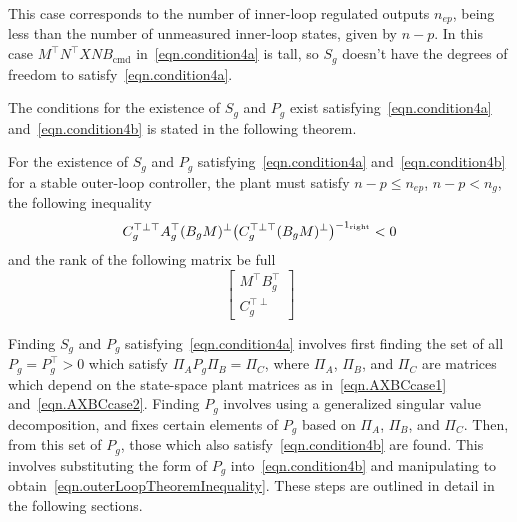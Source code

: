 \documentclass[journal]{IEEEtran}
\theoremstyle{innercustomthm}
\begin{document}
  This case corresponds to the number of inner-loop regulated outputs $n_{ep}$, being less than the number of unmeasured inner-loop states, given by $n-p$.
  In this case $M^{\top}N^{\top}XNB_{\text{cmd}}$ in\ \eqref{eqn.condition4a} is tall, so $S_{g}$ doesn't have the degrees of freedom to satisfy\ \eqref{eqn.condition4a}.

  The conditions for the existence of $S_{g}$ and $P_{g}$ exist satisfying\ \eqref{eqn.condition4a} and\ \eqref{eqn.condition4b} is stated in the following theorem.

  \begin{thm-dan}\label{thm.existenceOuterLoop}
    For the existence of $S_{g}$ and $P_{g}$ satisfying\ \eqref{eqn.condition4a} and\ \eqref{eqn.condition4b} for a stable outer-loop controller, the plant must satisfy $n-p\leq n_{ep}$, $n-p<n_{g}$, the following inequality
    \begin{equation}
      \label{eqn.outerLoopTheoremInequality}
      C_{g}^{\top\perp\top}A_{g}^{\top}(B_{g}M)^{\perp}\bigr(C_{g}^{\top\perp\top}(B_{g}M)^{\perp}\bigr)^{-1_{\textnormal{right}}}
      <
      0
    \end{equation}
    and the rank of the following matrix be full
    \begin{equation*}
      \begin{bmatrix}
        M^{\top}B_{g}^{\top} \\
        C_{g}^{\top\perp}
      \end{bmatrix}
    \end{equation*}
  \end{thm-dan}

  \begin{proof-dan}
    Finding $S_{g}$ and $P_{g}$ satisfying\ \eqref{eqn.condition4a} involves first finding the set of all $P_{g}=P_{g}^{\top}>0$ which satisfy $\Pi_{A}P_{g}\Pi_{B}=\Pi_{C}$, where $\Pi_{A}$, $\Pi_{B}$, and $\Pi_{C}$ are matrices which depend on the state-space plant matrices as in\ \eqref{eqn.AXBCcase1} and\ \eqref{eqn.AXBCcase2}.
    Finding $P_{g}$ involves using a generalized singular value decomposition, and fixes certain elements of $P_{g}$ based on $\Pi_{A}$, $\Pi_{B}$, and $\Pi_{C}$.
    Then, from this set of $P_{g}$, those which also satisfy\ \eqref{eqn.condition4b} are found.
    This involves substituting the form of $P_{g}$ into\ \eqref{eqn.condition4b} and manipulating to obtain\ \eqref{eqn.outerLoopTheoremInequality}.
    These steps are outlined in detail in the following sections.
  \end{proof-dan}
\end{document}
